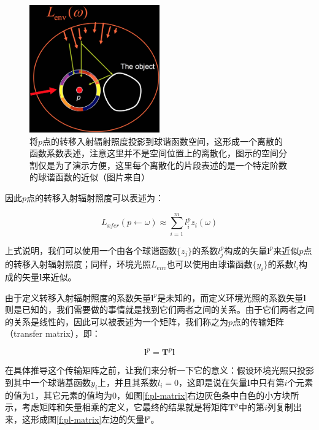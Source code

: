 \begin{figure}
\sidecaption
	\includegraphics[width=0.5\textwidth]{figures/prt/prt-10}
	\caption{将$p$点的转移入射辐射照度投影到球谐函数空间，这形成一个离散的函数系数表述，注意这里并不是空间位置上的离散化，图示的空间分割仅是为了演示方便，这里每个离散化的片段表述的是一个特定阶数的球谐函数的近似（图片来自\cite{a:PrecomputedRadianceTransfer:TheoryandPractice}）}
	\label{f:pl-tir-projection}
\end{figure}

因此$p$点的转移入射辐射照度可以表述为：

\begin{equation}\label{e:pl-transfer-incident-radiance}
	L_{xfer}(p\leftarrow\omega)\approx\sum^{m}_{i=1}l^{p}_{i}z_i(\omega)
\end{equation}

上式说明，我们可以使用一个由各个球谐函数$\{z_j\}$的系数$l^{p}_j$构成的矢量$\mathbf{l}^{p}$来近似$p$点的转移入射辐射照度；同样，环境光照$L_{env}$也可以使用由球谐函数$\{y_i\}$的系数$l_i$构成的矢量$\mathbf{l}$来近似。

由于定义转移入射辐射照度的系数矢量$\mathbf{l}^{p}$是未知的，而定义环境光照的系数矢量$\mathbf{l}$则是已知的，我们需要做的事情就是找到它们两者之间的关系。由于它们两者之间的关系是线性的，因此可以被表述为一个矩阵，我们称之为$p$点的传输矩阵（transfer matrix），即：

\begin{equation}
	\mathbf{l}^{p}=\mathbf{T}^{p}\mathbf{l}
\end{equation}

在具体推导这个传输矩阵之前，让我们来分析一下它的意义：假设环境光照只投影到其中一个球谐基函数$y_i$上，并且其系数$l_i=0$，这即是说在矢量$\mathbf{l}$中只有第$i$个元素的值为1，其它元素的值均为0，如图\ref{f:pl-matrix}右边灰色条中白色的小方块所示，考虑矩阵和矢量相乘的定义，它最终的结果就是将矩阵$\mathbf{T}^{p}$中的第$i$列复制出来，这形成图\ref{f:pl-matrix}左边的矢量$\mathbf{l}^{p}$。

